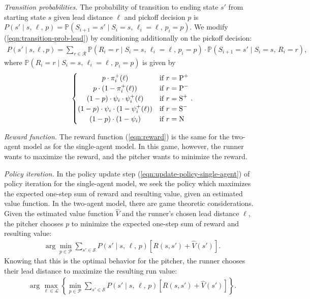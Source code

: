 \documentclass{article}
\begin{document}
        {\it Transition probabilities.} The probability of transition to ending state $s'$ from starting state $s$ given lead distance $\ell$ and pickoff decision $p$ is $P(s' \mid s,\, \ell,\, p) = \mathbb{P}(S_{i+1} = s' \mid S_i = s,\, \ell_i = \ell,\, p_i = p)$. We modify (\ref{eqn:transition-prob-lead}) by conditioning additionally on the pickoff decision:
        \begin{align}
          \label{eqn:transition-prob-lead-pickoff}
          P(s' \mid s, \ell, p) = \sum_{r \in \mathcal{R}} \mathbb{P}(R_i = r \mid S_i = s,\, \ell_i = \ell,\, p_i = p) \cdot \mathbb{P}(S_{i+1} = s' \mid S_i = s,\, R_i = r),
        \end{align}
        where $\mathbb{P}(R_i = r \mid S_i = s,\, \ell_i = \ell,\, p_i = p)$ is given by
        \begin{align*}
            \begin{cases}
                \hfil p \cdot \pi_i^+(\ell)                             & \mbox{if } r = \mbox{P}^+\\
                \hfil p \cdot (1 - \pi_i^+(\ell))                       & \mbox{if } r = \mbox{P}^-\\
                \hfil (1 - p) \cdot \psi_i \cdot \psi_i^+(\ell)         & \mbox{if } r = \mbox{S}^+\\
                \hfil (1 - p) \cdot \psi_i \cdot (1 - \psi_i^+(\ell))   & \mbox{if } r = \mbox{S}^-\\
                \hfil (1 - p) \cdot (1 - \psi_i)                        & \mbox{if } r = \mbox{N}\\
            \end{cases}.
        \end{align*}

        {\it Reward function.} The reward function (\ref{eqn:reward}) is the same for the two-agent model as for the single-agent model. In this game, however, the runner wants to maximize the reward, and the pitcher wants to minimize the reward.

        {\it Policy iteration.} In the policy update step (\ref{eqn:update-policy-single-agent}) of policy iteration for the single-agent model, we seek the policy which maximizes the expected one-step sum of reward and resulting value, given an estimated value function. In the two-agent model, there are game theoretic considerations. Given the estimated value function $\hat V$ and the runner's chosen lead distance $\ell$, the pitcher chooses $p$ to minimize the expected one-step sum of reward and resulting value:
        \begin{align*}
          \arg\min_{p\in\mathcal{P}} \sum_{s' \in \mathcal{S}} P(s' \mid s,\, \ell,\, p) [R(s, s') + \hat V(s')].
        \end{align*}
        Knowing that this is the optimal behavior for the pitcher, the runner chooses their lead distance to maximize the resulting run value:
        \begin{align*}
          \arg\max_{\ell \in \mathcal{L}}\left\{\min_{p\in\mathcal{P}} \sum_{s' \in \mathcal{S}} P(s' \mid s,\, \ell,\, p) [R(s, s') + \hat V(s')]\right\}.
        \end{align*}
\end{document}
